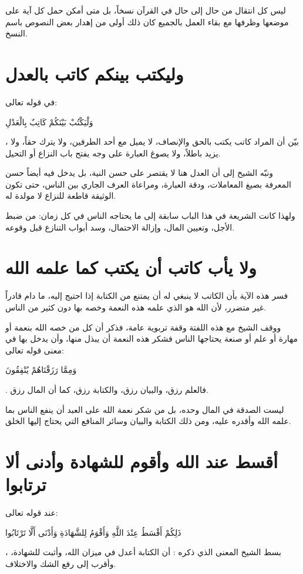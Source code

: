 \begin{fawaid}
ليس كل انتقال من حال إلى حال في القرآن نسخاً، بل متى أمكن حمل كل آية على موضعها وظرفها مع بقاء العمل بالجميع كان ذلك أولى من إهدار بعض النصوص باسم النسخ.
\end{fawaid}

\section{وليكتب بينكم كاتب بالعدل}
في قوله تعالى: \begin{ayah}وَلْيَكْتُبْ بَيْنَكُمْ كَاتِبٌ بِالْعَدْلِ\end{ayah}، بيّن  أن المراد كاتب يكتب بالحق والإنصاف، لا يميل مع أحد الطرفين، ولا يترك حقاً، ولا يزيد باطلاً، ولا يصوغ العبارة على وجه يفتح باب النزاع أو التحيل.

ونبّه الشيخ إلى أن العدل هنا لا يقتصر على حسن النية، بل يدخل فيه أيضاً حسن المعرفة بصيغ المعاملات، ودقة العبارة، ومراعاة العرف الجاري بين الناس، حتى تكون الوثيقة قاطعة للنزاع لا مولدة له.

ولهذا كانت الشريعة في هذا الباب سابقة إلى ما يحتاجه الناس في كل زمان: من ضبط الأجل، وتعيين المال، وإزالة الاحتمال، وسد أبواب التنازع قبل وقوعه.

\section{ولا يأب كاتب أن يكتب كما علمه الله}
فسر  هذه الآية بأن الكاتب لا ينبغي له أن يمتنع من الكتابة إذا احتيج إليه، ما دام قادراً غير متضرر، لأن الله هو الذي علمه هذه النعمة وخصه بها دون كثير من الناس.

ووقف الشيخ مع هذه اللفتة وقفة تربوية عامة، فذكر أن كل من خصه الله بنعمة أو مهارة أو علم أو صنعة يحتاجها الناس فشكر هذه النعمة أن يبذل منها، وأن يدخل بها في معنى قوله تعالى: \begin{ayah}وَمِمَّا رَزَقْنَاهُمْ يُنْفِقُونَ\end{ayah}. فالعلم رزق، والبيان رزق، والكتابة رزق، كما أن المال رزق.

\begin{fawaid}
ليست الصدقة في المال وحده، بل من شكر نعمة الله على العبد أن ينفع الناس بما علمه الله وأقدره عليه، ومن ذلك الكتابة والبيان وسائر المنافع التي يحتاج إليها الخلق.
\end{fawaid}

\separator

\section{أقسط عند الله وأقوم للشهادة وأدنى ألا ترتابوا}
عند قوله تعالى: \begin{ayah}ذَلِكُمْ أَقْسَطُ عِنْدَ اللَّهِ وَأَقْوَمُ لِلشَّهَادَةِ وَأَدْنَى أَلَّا تَرْتَابُوا\end{ayah}، بسط الشيخ المعنى الذي ذكره : أن الكتابة أعدل في ميزان الله، وأثبت للشهادة، وأقرب إلى رفع الشك والاختلاف.

